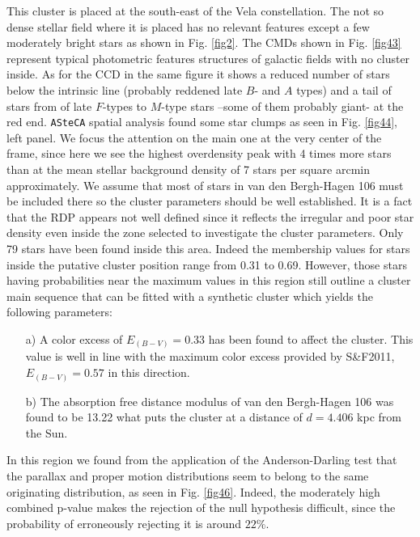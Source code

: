 \documentclass{aa}
\begin{document}
This cluster is placed at the south-east of the Vela constellation. The not so
dense stellar field where it is placed has no relevant features except a few
moderately bright stars as shown in Fig. \ref{fig2}. The CMDs shown in
Fig. \ref{fig43} represent typical photometric features structures of galactic
fields with no cluster inside. As for the CCD in the same figure it shows a
reduced number of stars below the intrinsic line (probably reddened late $B$-
and $A$ types) and a tail of stars from of late $F$-types to $M$-type stars
–some of them probably giant- at the red end.
\texttt{ASteCA} spatial analysis found some star clumps as seen in Fig. 
\ref{fig44}, left panel. We focus the attention on the main one at the very
center of the frame, since here we see the highest overdensity peak with 4 times
more stars than at the mean stellar background density of 7 stars per square
arcmin approximately. We assume that most of stars in van den Bergh-Hagen 106
must be included there so the cluster parameters should be well established. It
is a fact that the RDP appears not well defined since it reflects the irregular
and poor star density even inside the zone selected to investigate the cluster
parameters. Only 79 stars have been found inside this area. Indeed the
membership values for stars inside the putative cluster position range from 0.31
to 0.69. However, those stars having probabilities near the maximum values in
this region still outline a cluster main sequence that can be fitted with a
synthetic cluster which yields the following parameters:

\begin{itemize}
\item [a)] A color excess of $E_{(B-V)} = 0.33$ has been found to affect the
    cluster. This value is well in line with the maximum color excess provided
    by S\&F2011, $E_{(B-V)} = 0.57$ in this direction.
\item [b)] The absorption free distance modulus of van den Bergh-Hagen 106 was
    found to be 13.22 what puts the cluster at a distance of $d=4.406$ kpc from
    the Sun.
\end{itemize}

In this region we found from the application of the Anderson-Darling test that
the parallax and proper motion distributions seem to belong to the same
originating distribution, as seen in Fig. \ref{fig46}. Indeed, the moderately
high combined p-value makes the rejection of the null hypothesis difficult,
since the probability of erroneously rejecting it is around $22\%$.\\
\end{document}
